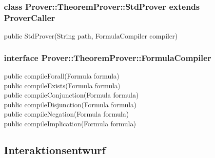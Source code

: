 \subsubsection{class Prover::TheoremProver::StdProver extends ProverCaller}%

\begin{description}%
    \item[public StdProver(String path, FormulaCompiler compiler)]%

\end{description}%

\subsubsection{interface Prover::TheoremProver::FormulaCompiler}%

\begin{description}%
    \item[public compileForall(Formula formula)]%

    \item[public compileExists(Formula formula)]%

    \item[public compileConjunction(Formula formula)]%

    \item[public compileDisjunction(Formula formula)]%

    \item[public compileNegation(Formula formula)]%

    \item[public compileImplication(Formula formula)]%

\end{description}%

\subsection{Interaktionsentwurf}%

